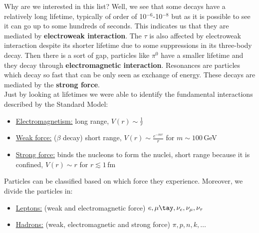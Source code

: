 \documentclass[../main.tex]{subfiles}
\begin{document}
Why are we interested in this list? Well, we see that some decays have a relatively long lifetime, typically of order of 10$^{-6}$-10$^{-8}$ but as it is possible to see it can go up to some hundreds of seconds. This indicates us that they are mediated by \textbf{electroweak interaction}. The $\tau$ is also affected by electroweak interaction despite its shorter lifetime due to some suppressions in its three-body decay. Then there is a sort of gap, particles like $\pi^0$ have a smaller lifetime and they decay through \textbf{electromagnetic interaction}. Resonances are particles which decay so fast that can be only seen as exchange of energy. These decays are mediated by the \textbf{strong force}.\\
Just by looking at lifetimes we were able to identify the fundamental interactions described by the Standard Model:
\begin{itemize}
    \item \underline{Electromagnetism:} long range, $V(r)\sim\frac{1}{r}$
    \item \underline{Weak force:} ($\beta$ decay) short range, $V(r)\sim \frac{e^{-mr}}{r}$ for $m\sim100$\,GeV
    \item \underline{Strong force:} binds the nucleons to form the nuclei, short range because it is confined, $V(r)\sim r$ for $r\lesssim1$\,fm
\end{itemize}
Particles can be classified based on which force they experience. Moreover, we divide the particles in:
\begin{itemize}
    \item \underline{Leptons:} (weak and electromagnetic force) $e,\mu\tay,\nu_e,\nu_\mu,\nu_\tau$
    \item \underline{Hadrons:} (weak, electromagnetic and strong force) $\pi,p,n,k,\dots$
\end{itemize}
\end{document}

